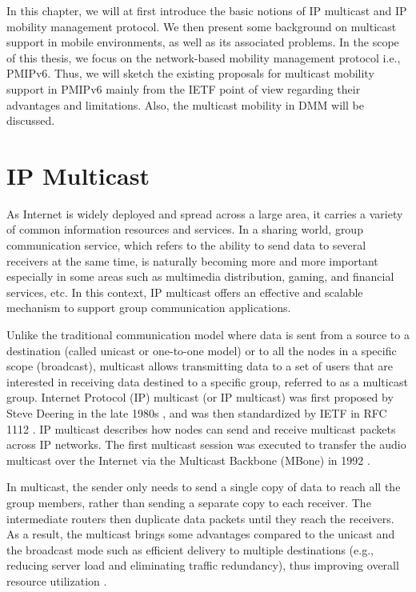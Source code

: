 In this chapter, we will at first introduce the basic notions of IP multicast and IP mobility management protocol. We then present some background on multicast support in mobile environments, as well as its associated problems. In the scope of this thesis, we focus on the network-based mobility management protocol i.e., PMIPv6. Thus, we will sketch the existing proposals for multicast mobility support in PMIPv6 mainly from the IETF point of view regarding their advantages and limitations. Also, the multicast mobility in DMM will be discussed. 

\section{IP Multicast}
As Internet is widely deployed and spread across a large area, it carries a variety of common information resources and services. In a sharing world, group communication service, which refers to the ability to send data to several receivers at the same time, is naturally becoming more and more important especially in some areas such as multimedia distribution, gaming, and financial services, etc. In this context, IP multicast offers an effective and scalable mechanism to support group communication applications. 

Unlike the traditional communication model where data is sent from a source to a destination (called unicast or one-to-one model) or to all the nodes in a specific scope (broadcast), multicast allows transmitting data to a set of users that are interested in receiving data destined to a specific group, referred to as a multicast group. Internet Protocol (IP) multicast (or IP multicast) was first proposed by Steve Deering in the late 1980s \cite{Deering_88}, and was then standardized by IETF in RFC 1112 \cite{RFC1112}. IP multicast describes how nodes can send and receive multicast packets across IP networks. The first multicast session was executed to transfer the audio multicast over the Internet via the Multicast Backbone (MBone) in 1992 \cite{developing_ip_multicast,Mbone}.   

In multicast, the sender only needs to send a single copy of data to reach all the group members, rather than sending a separate copy to each receiver. The intermediate routers then duplicate data packets until they reach the receivers. As a result, the multicast brings some advantages compared to the unicast and the broadcast mode such as efficient delivery to multiple destinations (e.g., reducing server load and eliminating traffic redundancy), thus improving overall resource utilization \cite{developing_ip_multicast}. 

